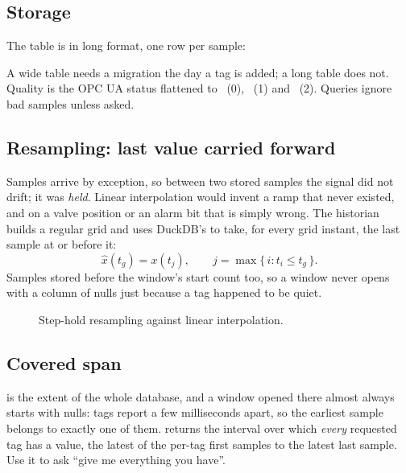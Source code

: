 \subsection{Storage}
The table is in long format, one row per sample:
\begin{center}
\end{center}
A wide table needs a migration the day a tag is added; a long table does not.
Quality is the OPC UA status flattened to ~(0),
~(1) and ~(2). Queries ignore bad samples unless
asked.

\subsection{Resampling: last value carried forward}

Samples arrive by exception, so between two stored samples the signal did not
drift; it was \emph{held}. Linear interpolation would invent a ramp that never
existed, and on a valve position or an alarm bit that is simply wrong. The
historian builds a regular grid and uses DuckDB's  to
take, for every grid instant, the last sample at or before it:
\begin{equation}
  \hat x(t_g) = x(t_j), \qquad j = \max\{\,i : t_i \le t_g\,\}.
\end{equation}
Samples stored before the window's start count too, so a window never opens
with a column of nulls just because a tag happened to be quiet.

\begin{figure}[htbp]
\centering
{}
\caption{Step-hold resampling against linear interpolation.}
\label{fig:locf}
\end{figure}

\subsection{Covered span}
 is the extent of the whole database, and a window opened there
almost always starts with nulls: tags report a few milliseconds apart, so the
earliest sample belongs to exactly one of them. 
returns the interval over which \emph{every} requested tag has a value, the
latest of the per-tag first samples to the latest last sample. Use it to ask
``give me everything you have''.

